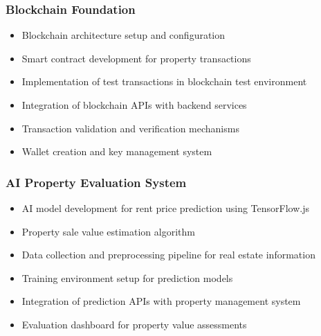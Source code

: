 \subsubsection{Blockchain Foundation}
\begin{itemize}
    \item Blockchain architecture setup and configuration
    \item Smart contract development for property transactions
    \item Implementation of test transactions in blockchain test environment
    \item Integration of blockchain APIs with backend services
    \item Transaction validation and verification mechanisms
    \item Wallet creation and key management system
\end{itemize}

\subsubsection{AI Property Evaluation System}
\begin{itemize}
    \item AI model development for rent price prediction using TensorFlow.js \cite{SmilkovTensorFlowJS2019}
    \item Property sale value estimation algorithm
    \item Data collection and preprocessing pipeline for real estate information
    \item Training environment setup for prediction models
    \item Integration of prediction APIs with property management system
    \item Evaluation dashboard for property value assessments
\end{itemize}

